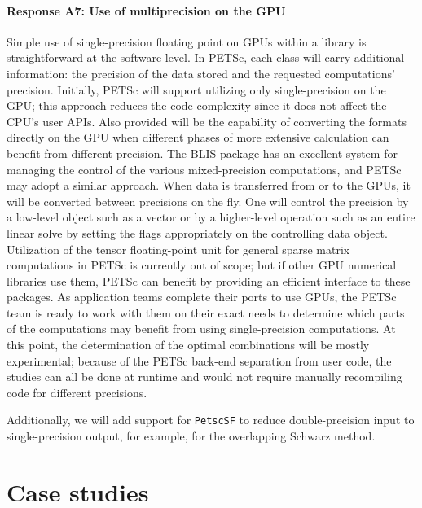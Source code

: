 \documentclass[10pt,journal,compsoc]{IEEEtran}
\begin{document}
\paragraph{Response A7: Use of multiprecision on the GPU}
Simple use of single-precision floating point on GPUs within a library is
straightforward at the software level. In PETSc, each class will carry additional information: the precision of the data stored and the requested computations' precision. Initially, PETSc will support utilizing only single-precision on the GPU; this approach reduces the code complexity since it does not affect
the CPU's user APIs. Also provided will be the capability of converting the
formats directly on the GPU when different phases of more extensive calculation can
benefit from different precision. The BLIS \cite{BLIS7} package has an excellent
system for managing the control of the various mixed-precision computations, and
PETSc may adopt a similar approach. When data is transferred from or to the
GPUs, it will be converted between precisions on the fly. One will control the precision by a low-level object such
as a vector or by a higher-level operation such as an entire linear solve by
setting the flags appropriately on the controlling data object. Utilization of
the tensor floating-point unit for general sparse matrix computations in PETSc is
currently out of scope; but if other GPU numerical libraries use them, PETSc
can benefit by providing an efficient interface to these packages.    As application teams complete their
ports to use GPUs, the PETSc team is ready to work with them on their exact
needs to determine which parts of the computations may benefit from using
single-precision computations. At this point, the determination of the optimal
combinations will be mostly experimental; because of the PETSc back-end
separation from user code, the studies can all be done at runtime and would not
require manually recompiling code for different precisions. 

Additionally, we will add support for {\tt PetscSF} to reduce double-precision input to single-precision output, for example, for the
overlapping Schwarz method.




\section{Case studies}
\end{document}
